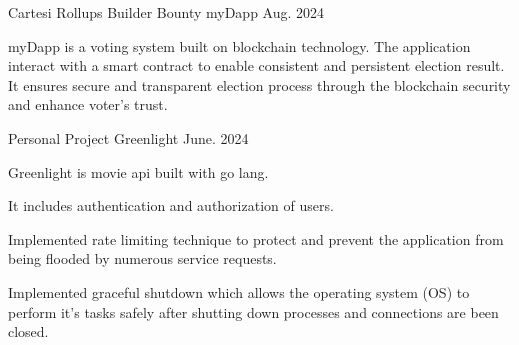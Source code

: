 
\begin{cventries}

  \cventry
  {Cartesi Rollups Builder Bounty} %
  {myDapp } %
  {} %
  {Aug. 2024} %
  {
    \begin{cvitems} %
      \item {myDapp is a voting system built on blockchain technology. The application interact with a smart contract to enable consistent and persistent election result. It ensures secure and transparent election process through the blockchain security and enhance voter's trust.}
    \end{cvitems}
  }
  \cventry
  {Personal Project} %
  {Greenlight } %
  {} %
  {June. 2024} %
  {
    \begin{cvitems} %
      \item {Greenlight is movie api built with go lang.}
      \item {It includes authentication and authorization of users.}
      \item {Implemented rate limiting technique to protect and prevent the application from being flooded by numerous service requests.}
      \item {Implemented graceful shutdown which allows the operating system (OS) to perform it's tasks safely after shutting down processes and connections are been closed.}
    \end{cvitems}
  }


\end{cventries}
